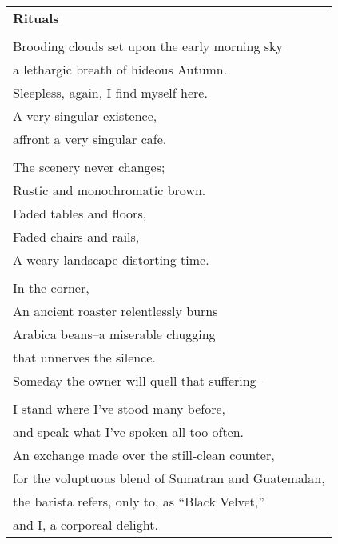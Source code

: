 \documentclass{article}
\begin{document}
\newcommand{\h}{\hspace{3ex}}
\newcommand{\hoar}{%
\begin{center}
\line(1,0){350}
\end{center}
}

\begin{center}
\begin{tabular}{l}
\textbf{Rituals} \\
\\
Brooding clouds set upon the early morning sky \\
a lethargic breath of hideous Autumn. \\
Sleepless, again, I find myself here. \\
A very singular existence, \\
affront a very singular cafe. \\
\\
The scenery never changes; \\
Rustic and monochromatic brown. \\
Faded tables and floors, \\
Faded chairs and rails, \\
A weary landscape distorting time. \\
\\
In the corner, \\
An ancient roaster relentlessly burns \\
Arabica beans--a miserable chugging \\
that unnerves the silence. \\
Someday the owner will quell that suffering-- \\
\\
I stand where I've stood many before, \\
and speak what I've spoken all too often. \\
An exchange made over the still-clean counter, \\
for the voluptuous blend of Sumatran and Guatemalan, \\
the barista refers, only to, as ``Black Velvet,'' \\
and I, a corporeal delight. \\
\end{tabular}
\end{center}
\end{document}
